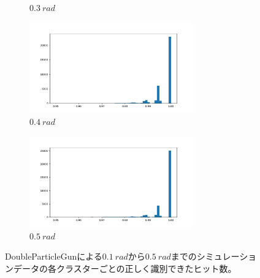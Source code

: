 \begin{figure}[H]
\begin{subfigure}{.5\textwidth}
\begin{center}
			\caption{$\SI{0.3}{rad}$}
			\label{fig:sfig2}
		\end{center}
	\end{subfigure}
		\begin{subfigure}{.5\textwidth}
		\begin{center}
			\includegraphics[width=200pt]{./Figure/DLAnalysis/rate_pred_4.png}%
			\caption{$\SI{0.4}{rad}$}
			\label{fig:sfig2}
		\end{center}
	\end{subfigure}
	\begin{subfigure}{.5\textwidth}
		\begin{center}
			\includegraphics[width=200pt]{./Figure/DLAnalysis/rate_pred_5.png}%
			\caption{$\SI{0.5}{rad}$}
			\label{fig:sfig2}
		\end{center}
	\end{subfigure}

	\caption[DoubleParticleGunによる$\SI{0.1}{rad}$から$\SI{0.5}{rad}$までのシミュレーションデータの各クラスターごとの正しく識別できたヒット数]{DoubleParticleGunによる$\SI{0.1}{rad}$から$\SI{0.5}{rad}$までのシミュレーションデータの各クラスターごとの正しく識別できたヒット数。}
	\label{result_DoublePG}
\end{figure}

